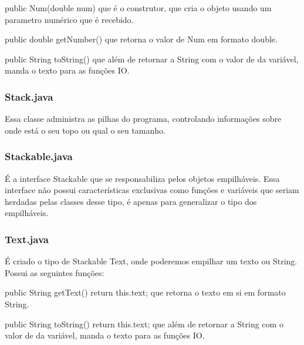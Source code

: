 \documentclass[a4paper]{article}
\begin{document}
			public Num(double num)
			que é o construtor, que cria o objeto usando
			um parametro numérico que é recebido.
    
    		public double getNumber()
 	  		que retorna o valor de Num em formato double.
    
    		public String toString()
			que além de retornar a String com o valor de
			da variável, manda o texto para as funções IO.
			
		\subsubsection { Stack.java }
			Essa classe administra as pilhas do programa,
			controlando informações sobre onde está o seu 
			topo ou qual o seu tamanho.
			
			
		\subsubsection { Stackable.java }
			É a interface Stackable que se responsabiliza
			pelos objetos empilháveis. Essa interface não
			possui características exclusivas como funções
			e variáveis que seriam herdadas pelas classes
			desse tipo, é apenas para generalizar o tipo
			dos empilháveis.
			
		\subsubsection { Text.java }
			É criado o tipo de Stackable Text, onde 
			poderemos empilhar um texto ou String.
			Possui as seguintes funções:
			
			public String getText()  { return this.text; }
			que retorna o texto em si em formato String.
			
    		public String toString() { return this.text; }
			que além de retornar a String com o valor de
			da variável, manda o texto para as funções IO.
\end{document}
